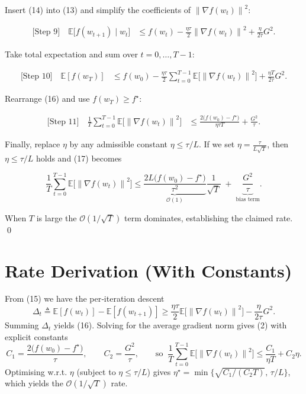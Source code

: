 \documentclass{article}
\newcommand{\E}{\mathbb{E}}
\newcommand{\norm}[1]{\left\|#1\right\|}
\begin{document}
Insert (14) into (13) and simplify the coefficients of $\norm{\nabla f(w_{t})}^{2}$:

\begin{align}
\text{[Step 9]} \quad
\E\!\big[f(w_{t+1})\mid w_{t}\big]
&\le f(w_{t})
   -\frac{\eta\tau}{2}\norm{\nabla f(w_{t})}^{2}
   +\frac{\eta}{2\tau}G^{2}.
\tag{15}
\end{align}

Take total expectation and sum over $t=0,\dots,T-1$:

\begin{align}
\text{[Step 10]} \quad
\E[f(w_{T})]
&\le f(w_{0})
   -\frac{\eta\tau}{2}\sum_{t=0}^{T-1}\E\!\big[\norm{\nabla f(w_{t})}^{2}\big]
   +\frac{\eta T}{2\tau}G^{2}.
\tag{16}
\end{align}

Rearrange (16) and use $f(w_{T})\ge f^{\star}$:

\begin{align}
\text{[Step 11]} \quad
\frac{1}{T}\sum_{t=0}^{T-1}\E\!\big[\norm{\nabla f(w_{t})}^{2}\big]
&\le
\frac{2\big(f(w_{0})-f^{\star}\big)}{\eta\tau T}
+\frac{G^{2}}{\tau}.
\tag{17}
\end{align}

Finally, replace $\eta$ by any admissible constant $\eta\le\tau/L$.
If we set $\eta=\frac{\tau}{L\sqrt{T}}$, then $\eta\le\tau/L$ holds and (17) becomes

\[
\frac{1}{T}\sum_{t=0}^{T-1}\E\!\big[\norm{\nabla f(w_{t})}^{2}\big]
\le
\underbrace{\frac{2L\big(f(w_{0})-f^{\star}\big)}{\tau^{2}}}_{\mathcal{O}(1)}\frac{1}{\sqrt{T}}
\;+\;
\underbrace{\frac{G^{2}}{\tau}}_{\text{bias term}}.
\]

When $T$ is large the $\mathcal{O}(1/\sqrt{T})$ term dominates, establishing the claimed rate. \qed

\section*{Rate Derivation (With Constants)}
From (15) we have the per‑iteration descent
\[
\Delta_{t}\triangleq \E[f(w_{t})]-\E[f(w_{t+1})]
\ge \frac{\eta\tau}{2}\E\!\big[\norm{\nabla f(w_{t})}^{2}\big]-\frac{\eta}{2\tau}G^{2}.
\]
Summing $\Delta_{t}$ yields (16). Solving for the average gradient norm gives (2) with explicit constants
\[
C_{1}= \frac{2\big(f(w_{0})-f^{\star}\big)}{\tau},\qquad
C_{2}= \frac{G^{2}}{\tau},\qquad
\text{so}\;\;
\frac{1}{T}\sum_{t=0}^{T-1}\E\!\big[\norm{\nabla f(w_{t})}^{2}\big]\le
\frac{C_{1}}{\eta T}+C_{2}\eta .
\]
Optimising w.r.t. $\eta$ (subject to $\eta\le \tau/L$) gives $\eta^{\star}= \min\!\big\{\sqrt{C_{1}/(C_{2}T)},\,\tau/L\big\}$,
which yields the $\mathcal{O}(1/\sqrt{T})$ rate.
\end{document}
